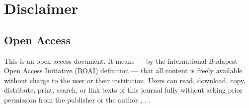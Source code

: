 {}


\thispagestyle{plain}

\chapter*{Disclaimer}

\section*{Open Access}

This is an open-access document.
It means 
--- by the international Budapest Open Access Initiative 
\href{https://www.budapestopenaccessinitiative.org/}{(BOAI)}
definition --- that all content is freely available without charge to the user or their institution.
Users can read, download, copy, distribute, print, search, 
or link texts of this journal fully without asking prior permission from the publisher or the author
\citeauthor{article.gummensson02}, \citep{article.gummensson02}.
\nocite{article.cynthia10}.

